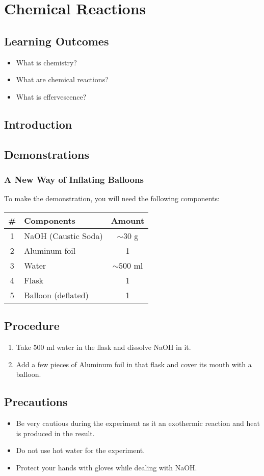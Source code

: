 \chapter{Chemical Reactions}

\section*{Learning Outcomes}
\small{
\begin{itemize}[leftmargin=*]\itemsep0em
\item What is chemistry? 
\item What are chemical reactions? 
\item What is effervescence?

\end{itemize}
}
\section*{Introduction}

\section*{Demonstrations}
\subsection*{A New Way of Inflating Balloons}

To make the demonstration, you will need the following components:
\begin{table}[H]
    \centering
    \begin{tabular}{|c|l|c|}\hline
     \textbf{\#} & \textbf{Components} &  \textbf{Amount}\\\hline
     1 & NaOH (Caustic Soda)    &  $\sim 30$ g\\\hline
     2 & Aluminum foil          &  1           \\\hline
     3 & Water                  &  $\sim 500$ ml\\\hline
     4 & Flask                  &  1            \\\hline
     5 & Balloon (deflated)     &  1             \\\hline
    \end{tabular}
\end{table}

\section*{Procedure}
\begin{enumerate}
    \item Take 500 ml water in the flask and dissolve NaOH in it.
    \item Add a few pieces of Aluminum foil in that flask and cover its mouth with a balloon.
\end{enumerate}

\section*{Precautions}
\begin{itemize}[leftmargin=*]
\item Be very cautious during the experiment as it an exothermic reaction and heat is produced in the result. 
\item Do not use hot water for the experiment.
\item Protect your hands with gloves while dealing with NaOH. 
\end{itemize}

